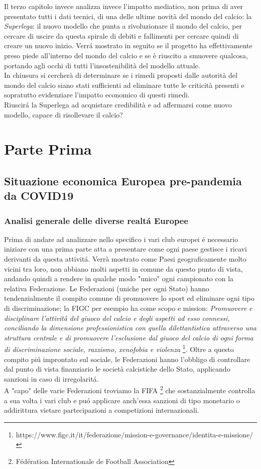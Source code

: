\documentclass[
    corpo=11.5pt,
    oneside,
    evenboxes,
    tipotesi=triennale,
    stile=classica,
    oldstyle,
    autoretitolo,
    greek,
]{toptesi}
\begin{document}
\begin{interlinea}{1.5}
Il terzo capitolo invece analizza invece l'impatto mediatico, non prima di aver presentato tutti i dati tecnici, di una delle ultime novità 
del mondo del calcio: la \emph{Superlega}: il nuovo modello che punta a rivoluzionare il mondo del calcio, per cercare di uscire da questa spirale di debiti
e fallimenti per cercare quindi di creare un nuovo inizio. Verr\'a mostrato in seguito se il progetto ha effettivamente preso piede all'interno del mondo del calcio 
e se è riuscito a smuovere qualcosa, portando agli occhi di tutti l'insostenibilità del modello attuale.\\
In chiusura si cercherà di determinare se i rimedi proposti dalle autorità del mondo del calcio siano stati sufficienti ad eliminare tutte le criticità presenti e 
sopratutto evidenziare l'impatto economico di questi rimedi.\\
Riuscir\'a la Superlega ad acquistare credibilità e ad affermarsi come nuovo modello, capace di risollevare il calcio?

\part{Parte Prima}
\chapter{Situazione economica Europea pre-pandemia da COVID19}
\section{Analisi generale delle diverse realt\'a Europee}
Prima di andare ad analizzare nello specifico i vari club europei \'e necessario iniziare con una prima 
parte atta a presentare come ogni paese gestisce i ricavi derivanti da questa attivit\'a. Verrà mostrato come Paesi geograficamente
molto vicini tra loro, non abbiano molti aspetti in comune da questo punto di vista, andando quindi a rendere in qualche modo 
"unico" ogni campionato con la relativa Federazione. Le Federazioni (uniche per ogni Stato) hanno tendenzialmente il compito
comune di promuovere lo sport ed eliminare ogni tipo di discriminazione; la FIGC per esempio ha come scopo e mission: 
\emph{Promuovere e disciplinare l’attività del giuoco del calcio e degli aspetti ad esso connessi, conciliando la 
dimensione professionistica con quella dilettantistica attraverso una struttura centrale e di promuovere l’esclusione dal 
giuoco del calcio di ogni forma di discriminazione sociale, razzismo, xenofobia e violenza} \footnote{https://www.figc.it/it/federazione/mission-e-governance/identita-e-missione/}. Oltre a questo compito 
pi\'u improntato sul sociale, le Federazioni hanno l'obbligo di controllare dal punto di vista finanziario le società calcistiche
dello Stato, applicando sanzioni in caso di irregolarit\'a.\\
A "capo" delle varie Federazioni troviamo la FIFA \footnote{Fédération Internationale de Football Association} che sostanzialmente 
controlla a sua volta i vari club e pu\'o applicare anch'essa sanzioni di tipo monetario o addirittura vietare partecipazioni a 
competizioni internazionali.


\end{interlinea}
\end{document}
